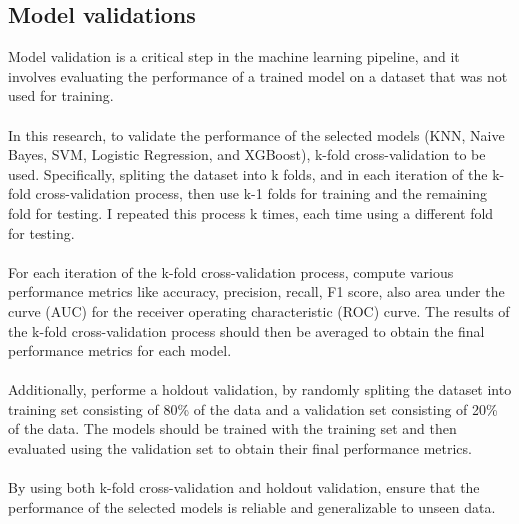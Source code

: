 \subsection{Model validations}
Model validation is a critical step in the machine learning pipeline, and it involves evaluating the performance 
of a trained model on a dataset that was not used for training.\\\\
In this research, to validate the performance of the selected models (KNN, Naive Bayes, SVM, Logistic Regression, 
and XGBoost), k-fold cross-validation to be used. Specifically, spliting the dataset into k folds, and in each 
iteration of the k-fold cross-validation process, then use k-1 folds for training and the remaining fold for 
testing. I repeated this process k times, each time using a different fold for testing.\\\\
For each iteration of the k-fold cross-validation process, compute various performance metrics like accuracy, 
precision, recall, F1 score, also area under the curve (AUC) for the receiver operating characteristic (ROC) curve.
The results of the k-fold cross-validation process should then be averaged to obtain the final performance metrics 
for each model.\\\\
Additionally, performe a holdout validation, by randomly spliting the dataset 
into training set consisting of 80\% of the data and a validation set consisting of 20\% of the data.
The models should be trained with the training set and then evaluated using the
validation set to obtain their final performance metrics.\\\\
By using both k-fold cross-validation and holdout validation, ensure that the performance of the selected models 
is reliable and generalizable to unseen data.

